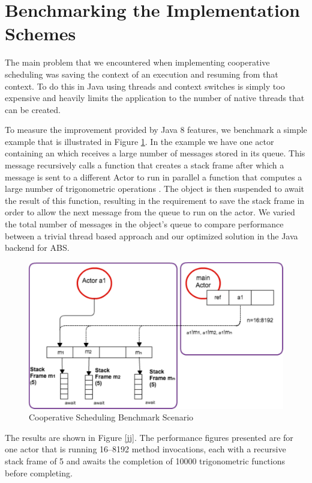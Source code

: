 \section{Benchmarking the Implementation Schemes}
\label{bench}
The main problem that we encountered  when implementing cooperative scheduling was saving the context of an execution and resuming from that context. To do this in Java using threads and context switches is simply too expensive and heavily limits the application to the number of native threads that can be created. 

To measure the improvement provided by Java 8 features, we benchmark a
simple example that is illustrated in Figure \ref{sf}. In the
example we have one actor containing an  which receives a large
number of messages stored in its queue. This message recursively calls
a function that creates a stack frame after which a message is
sent to a different Actor to run in parallel a function that computes a large number of trigonometric operations . The object is then suspended to await the
result of this function, resulting in the requirement to save the stack frame in order to allow the next message from the queue to run
on the actor.  We varied the total number
of messages in the object's queue to compare performance between a trivial thread based approach and our optimized solution in the Java backend for ABS. 

\begin{figure}
	\label{sf}
	\centering
	\includegraphics[scale=0.6]{scenario}
	\caption{Cooperative Scheduling Benchmark Scenario}
\end{figure}

\par The results are shown in
Figure \ref{jj}. The performance figures presented are for one
actor that is running 16--8192 method invocations, each with a
recursive stack frame of 5 and awaits the
completion of 10000 trigonometric functions before completing. 



